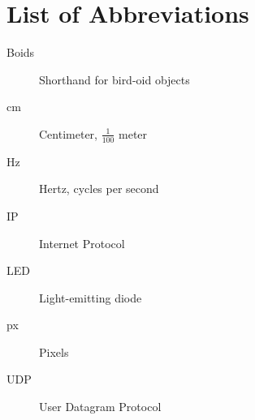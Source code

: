 \chapter*{List of Abbreviations}

\begin{description}
  \item[Boids] Shorthand for bird-oid objects
  \item[cm] Centimeter, $\frac{1}{100}$ meter
  \item[Hz] Hertz, cycles per second
  \item[IP] Internet Protocol
  \item[LED] Light-emitting diode
  \item[px] Pixels
  \item[UDP] User Datagram Protocol
\end{description}
